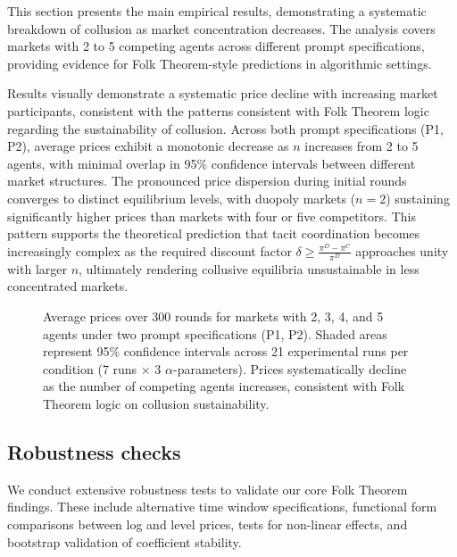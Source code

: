 This section presents the main empirical results, demonstrating a systematic breakdown of collusion as market concentration decreases. The analysis covers markets with 2 to 5 competing agents across different prompt specifications, providing evidence for Folk Theorem-style predictions in algorithmic settings.

Results visually demonstrate a systematic price decline with increasing market participants, consistent with the patterns consistent with Folk Theorem logic regarding the sustainability of collusion. Across both prompt specifications (P1, P2), average prices exhibit a monotonic decrease as $n$ increases from 2 to 5 agents, with minimal overlap in 95\% confidence intervals between different market structures. The pronounced price dispersion during initial rounds converges to distinct equilibrium levels, with duopoly markets ($n=2$) sustaining significantly higher prices than markets with four or five competitors. This pattern supports the theoretical prediction that tacit coordination becomes increasingly complex as the required discount factor $\delta \geq \frac{\pi^D - \pi^C}{\pi^D}$ approaches unity with larger $n$, ultimately rendering collusive equilibria unsustainable in less concentrated markets.

\begin{figure}[H]
    \centering
    
    \caption{Average prices over 300 rounds for markets with 2, 3, 4, and 5 agents under two prompt specifications (P1, P2). Shaded areas represent 95\% confidence intervals across 21 experimental runs per condition (7 runs × 3 $\alpha$-parameters). Prices systematically decline as the number of competing agents increases, consistent with Folk Theorem logic on collusion sustainability.}
    \label{fig:ts_prices_comb}
\end{figure}


\subsection*{Robustness checks}\label{app:robust}

We conduct extensive robustness tests to validate our core Folk Theorem findings. These include alternative time window specifications, functional form comparisons between log and level prices, tests for non-linear effects, and bootstrap validation of coefficient stability.

